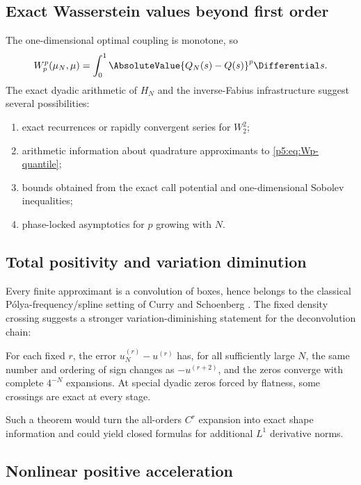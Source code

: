 \documentclass[11pt,oneside]{article}
\numberwithin{equation}{section}
\theoremstyle{definition}
\theoremstyle{remark}
\begin{document}
\subsection{Exact Wasserstein values beyond first order}

The one-dimensional optimal coupling is monotone, so
\begin{equation}
 W_p^p(\mu_N,\mu)=\int_0^1\AbsoluteValue{Q_N(s)-Q(s)}^p\Differential s.
 \label{p5:eq:Wp-quantile}
\end{equation}
The exact dyadic arithmetic of $H_N$ and the inverse-Fabius infrastructure suggest several possibilities:

\begin{enumerate}
\item exact recurrences or rapidly convergent series for $W_2^2$;
\item arithmetic information about quadrature approximants to \eqref{p5:eq:Wp-quantile};
\item bounds obtained from the exact call potential and one-dimensional Sobolev inequalities;
\item phase-locked asymptotics for $p$ growing with $N$.
\end{enumerate}

\subsection{Total positivity and variation diminution}

Every finite approximant is a convolution of boxes, hence belongs to the classical P\'olya-frequency/spline setting of Curry and Schoenberg \cite{p5:CurrySchoenberg1966}.  The fixed density crossing suggests a stronger variation-diminishing statement for the deconvolution chain:

\begin{conjecture}
For each fixed $r$, the error $u_N^{(r)}-u^{(r)}$ has, for all sufficiently large $N$, the same number and ordering of sign changes as $-u^{(r+2)}$, and the zeros converge with complete $4^{-N}$ expansions.  At special dyadic zeros forced by flatness, some crossings are exact at every stage.
\end{conjecture}

Such a theorem would turn the all-orders $C^r$ expansion into exact shape information and could yield closed formulas for additional $L^1$ derivative norms.

\subsection{Nonlinear positive acceleration}
\end{document}
